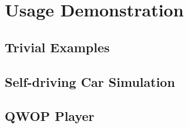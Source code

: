 \chapter{Usage Demonstration}
\todo

\section{Trivial Examples}
\todo

\section{Self-driving Car Simulation}
\todo

\section{QWOP Player}
\todo
